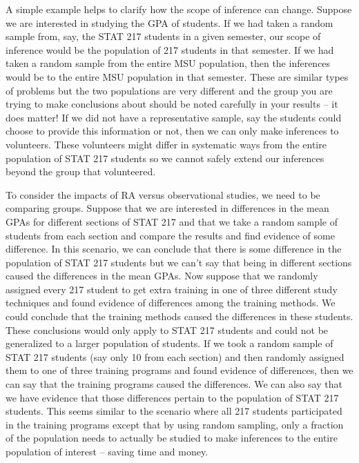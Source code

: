 \documentclass[]{book}
\theoremstyle{definition}
\theoremstyle{definition}
\theoremstyle{remark}
\begin{document}
\normalsize

A simple example helps to clarify how the scope of inference can change.
Suppose we are interested in studying the GPA of students. If we had
taken a random sample from, say, the STAT 217 students in a given
semester, our scope of inference would be the population of 217 students
in that semester. If we had taken a random sample from the entire MSU
population, then the inferences would be to the entire MSU population in
that semester. These are similar types of problems but the two
populations are very different and the group you are trying to make
conclusions about should be noted carefully in your results -- it does
matter! If we did not have a representative sample, say the students
could choose to provide this information or not, then we can only make
inferences to volunteers. These volunteers might differ in systematic
ways from the entire population of STAT 217 students so we cannot safely
extend our inferences beyond the group that volunteered.

To consider the impacts of RA versus observational studies, we need to
be comparing groups. Suppose that we are interested in differences in
the mean GPAs for different sections of STAT 217 and that we take a
random sample of students from each section and compare the results and
find evidence of some difference. In this scenario, we can conclude that
there is some difference in the population of STAT 217 students but we
can't say that being in different sections caused the differences in the
mean GPAs. Now suppose that we randomly assigned every 217 student to
get extra training in one of three different study techniques and found
evidence of differences among the training methods. We could conclude
that the training methods caused the differences in these students.
These conclusions would only apply to STAT 217 students and could not be
generalized to a larger population of students. If we took a random
sample of STAT 217 students (say only 10 from each section) and then
randomly assigned them to one of three training programs and found
evidence of differences, then we can say that the training programs
caused the differences. We can also say that we have evidence that those
differences pertain to the population of STAT 217 students. This seems
similar to the scenario where all 217 students participated in the
training programs except that by using random sampling, only a fraction
of the population needs to actually be studied to make inferences to the
entire population of interest -- saving time and money.
\end{document}
